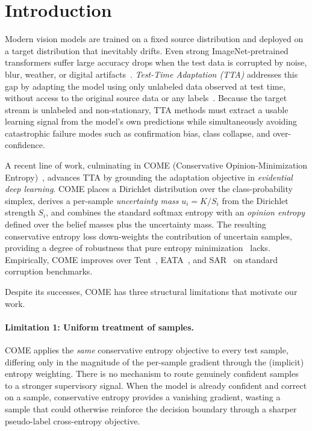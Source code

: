 \section{Introduction}
\label{sec:introduction}

Modern vision models are trained on a fixed source distribution and deployed on a target distribution that inevitably drifts. Even strong ImageNet-pretrained transformers suffer large accuracy drops when the test data is corrupted by noise, blur, weather, or digital artifacts~\citep{hendrycks2019robustness,dosovitskiy2021vit}. \emph{Test-Time Adaptation (TTA)} addresses this gap by adapting the model using only unlabeled data observed at test time, without access to the original source data or any labels~\citep{wang2021tent,sun2020ttt,schneider2020adabn}. Because the target stream is unlabeled and non-stationary, TTA methods must extract a usable learning signal from the model's own predictions while simultaneously avoiding catastrophic failure modes such as confirmation bias, class collapse, and over-confidence.

A recent line of work, culminating in COME (Conservative Opinion-Minimization Entropy)~\citep{come2024come}, advances TTA by grounding the adaptation objective in \emph{evidential deep learning}. COME places a Dirichlet distribution over the class-probability simplex, derives a per-sample \emph{uncertainty mass} $u_i = K / S_i$ from the Dirichlet strength $S_i$, and combines the standard softmax entropy with an \emph{opinion entropy} defined over the belief masses plus the uncertainty mass. The resulting conservative entropy loss down-weights the contribution of uncertain samples, providing a degree of robustness that pure entropy minimization~\citep{wang2021tent} lacks. Empirically, COME improves over Tent~\citep{wang2021tent}, EATA~\citep{niu2022eata}, and SAR~\citep{niu2023sar} on standard corruption benchmarks.

Despite its successes, COME has three structural limitations that motivate our work.

\paragraph{Limitation 1: Uniform treatment of samples.}
COME applies the \emph{same} conservative entropy objective to every test sample, differing only in the magnitude of the per-sample gradient through the (implicit) entropy weighting. There is no mechanism to route genuinely confident samples to a stronger supervisory signal. When the model is already confident and correct on a sample, conservative entropy provides a vanishing gradient, wasting a sample that could otherwise reinforce the decision boundary through a sharper pseudo-label cross-entropy objective.

